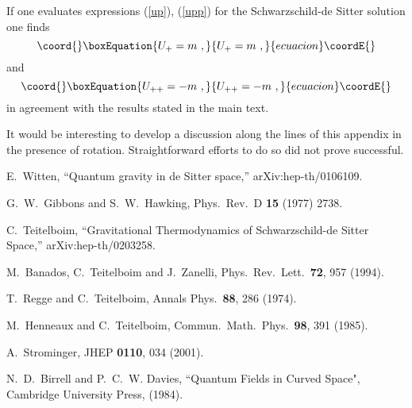 \documentclass[a4paper,preprintnumbers,amsmath,amssymb]{revtex4}
\begin{document}
If one evaluates expressions (\ref{up}),  (\ref{upp})
for the Schwarzschild-de Sitter solution one finds
\begin{equation}\coord{}\boxEquation{
U_+ = m \ ,
}{
U_+ = m \ ,
}{ecuacion}\coordE{}\end{equation}
and
\begin{equation}\coord{}\boxEquation{
U_{++} = -m \ ,
}{
U_{++} = -m \ ,
}{ecuacion}\coordE{}\end{equation}
in agreement with the results stated  in the main text.

It would be interesting to develop a discussion along the lines of this appendix
in the presence of rotation. Straightforward efforts to do so did not prove successful.

\begin{thebibliography}{}

E.~Witten,
``Quantum gravity in de Sitter space,''
arXiv:hep-th/0106109.

G.~W.~Gibbons and S.~W.~Hawking,
Phys.\ Rev.\ D {\bf 15} (1977) 2738.


C.~Teitelboim,
``Gravitational Thermodynamics of Schwarzschild-de Sitter Space,''
arXiv:hep-th/0203258.

M.~Banados, C.~Teitelboim and J.~Zanelli,
Phys.\ Rev.\ Lett.\  {\bf 72}, 957 (1994).

T.~Regge and C.~Teitelboim,
Annals Phys.\  {\bf 88}, 286 (1974).

M.~Henneaux and C.~Teitelboim,
Commun.\ Math.\ Phys.\  {\bf 98}, 391 (1985).

A.~Strominger,
JHEP {\bf 0110}, 034 (2001).

N.~D.~Birrell  and  P.~C.~W. Davies,
``Quantum Fields in Curved Space",
Cambridge University Press, (1984).

\end{thebibliography}
\end{document}
